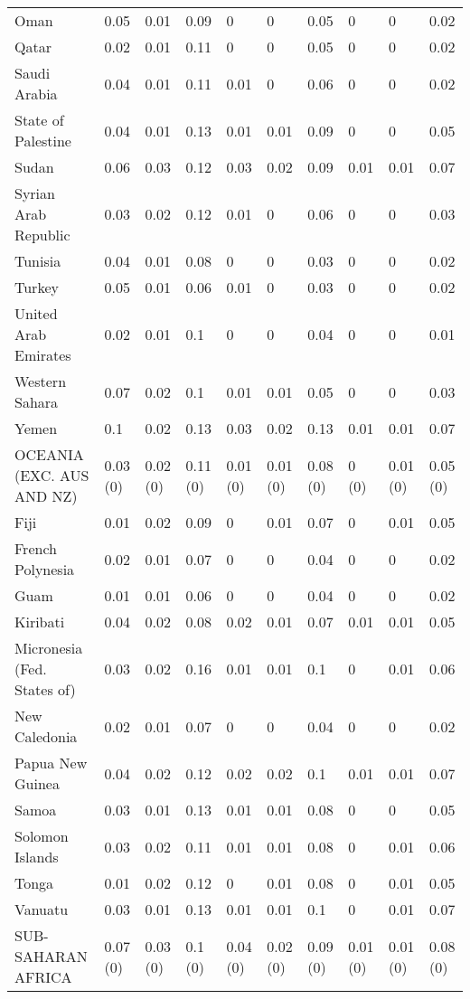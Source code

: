 \begin{longtable}[t]{llllllllll}
Oman & 0.05 & 0.01 & 0.09 & 0 & 0 & 0.05 & 0 & 0 & 0.02\\
Qatar & 0.02 & 0.01 & 0.11 & 0 & 0 & 0.05 & 0 & 0 & 0.02\\
Saudi Arabia & 0.04 & 0.01 & 0.11 & 0.01 & 0 & 0.06 & 0 & 0 & 0.02\\
State of Palestine & 0.04 & 0.01 & 0.13 & 0.01 & 0.01 & 0.09 & 0 & 0 & 0.05\\
Sudan & 0.06 & 0.03 & 0.12 & 0.03 & 0.02 & 0.09 & 0.01 & 0.01 & 0.07\\
Syrian Arab Republic & 0.03 & 0.02 & 0.12 & 0.01 & 0 & 0.06 & 0 & 0 & 0.03\\
Tunisia & 0.04 & 0.01 & 0.08 & 0 & 0 & 0.03 & 0 & 0 & 0.02\\
Turkey & 0.05 & 0.01 & 0.06 & 0.01 & 0 & 0.03 & 0 & 0 & 0.02\\
United Arab Emirates & 0.02 & 0.01 & 0.1 & 0 & 0 & 0.04 & 0 & 0 & 0.01\\
Western Sahara & 0.07 & 0.02 & 0.1 & 0.01 & 0.01 & 0.05 & 0 & 0 & 0.03\\
Yemen & 0.1 & 0.02 & 0.13 & 0.03 & 0.02 & 0.13 & 0.01 & 0.01 & 0.07\\
OCEANIA (EXC. AUS AND NZ) & 0.03 (0) & 0.02 (0) & 0.11 (0) & 0.01 (0) & 0.01 (0) & 0.08 (0) & 0 (0) & 0.01 (0) & 0.05 (0)\\
Fiji & 0.01 & 0.02 & 0.09 & 0 & 0.01 & 0.07 & 0 & 0.01 & 0.05\\
French Polynesia & 0.02 & 0.01 & 0.07 & 0 & 0 & 0.04 & 0 & 0 & 0.02\\
Guam & 0.01 & 0.01 & 0.06 & 0 & 0 & 0.04 & 0 & 0 & 0.02\\
Kiribati & 0.04 & 0.02 & 0.08 & 0.02 & 0.01 & 0.07 & 0.01 & 0.01 & 0.05\\
Micronesia (Fed. States of) & 0.03 & 0.02 & 0.16 & 0.01 & 0.01 & 0.1 & 0 & 0.01 & 0.06\\
New Caledonia & 0.02 & 0.01 & 0.07 & 0 & 0 & 0.04 & 0 & 0 & 0.02\\
Papua New Guinea & 0.04 & 0.02 & 0.12 & 0.02 & 0.02 & 0.1 & 0.01 & 0.01 & 0.07\\
Samoa & 0.03 & 0.01 & 0.13 & 0.01 & 0.01 & 0.08 & 0 & 0 & 0.05\\
Solomon Islands & 0.03 & 0.02 & 0.11 & 0.01 & 0.01 & 0.08 & 0 & 0.01 & 0.06\\
Tonga & 0.01 & 0.02 & 0.12 & 0 & 0.01 & 0.08 & 0 & 0.01 & 0.05\\
Vanuatu & 0.03 & 0.01 & 0.13 & 0.01 & 0.01 & 0.1 & 0 & 0.01 & 0.07\\
SUB-SAHARAN AFRICA & 0.07 (0) & 0.03 (0) & 0.1 (0) & 0.04 (0) & 0.02 (0) & 0.09 (0) & 0.01 (0) & 0.01 (0) & 0.08 (0)\\

\end{longtable}
